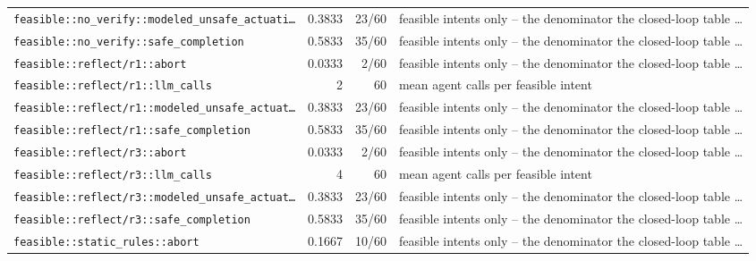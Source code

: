 \begin{center}
\begin{longtable}{@{}p{}rrp{}@{}}
\texttt{\scriptsize feasible:\allowbreak :\allowbreak no\_\allowbreak verify:\allowbreak :\allowbreak modeled\_\allowbreak unsafe\_\allowbreak actuati…} & 0.3833 & 23/60 & feasible intents only -- the denominator the closed-loop table … \\
\texttt{\scriptsize feasible:\allowbreak :\allowbreak no\_\allowbreak verify:\allowbreak :\allowbreak safe\_\allowbreak completion} & 0.5833 & 35/60 & feasible intents only -- the denominator the closed-loop table … \\
\texttt{\scriptsize feasible:\allowbreak :\allowbreak reflect/\allowbreak r1:\allowbreak :\allowbreak abort} & 0.0333 & 2/60 & feasible intents only -- the denominator the closed-loop table … \\
\texttt{\scriptsize feasible:\allowbreak :\allowbreak reflect/\allowbreak r1:\allowbreak :\allowbreak llm\_\allowbreak calls} & 2 & 60 & mean agent calls per feasible intent \\
\texttt{\scriptsize feasible:\allowbreak :\allowbreak reflect/\allowbreak r1:\allowbreak :\allowbreak modeled\_\allowbreak unsafe\_\allowbreak actuat…} & 0.3833 & 23/60 & feasible intents only -- the denominator the closed-loop table … \\
\texttt{\scriptsize feasible:\allowbreak :\allowbreak reflect/\allowbreak r1:\allowbreak :\allowbreak safe\_\allowbreak completion} & 0.5833 & 35/60 & feasible intents only -- the denominator the closed-loop table … \\
\texttt{\scriptsize feasible:\allowbreak :\allowbreak reflect/\allowbreak r3:\allowbreak :\allowbreak abort} & 0.0333 & 2/60 & feasible intents only -- the denominator the closed-loop table … \\
\texttt{\scriptsize feasible:\allowbreak :\allowbreak reflect/\allowbreak r3:\allowbreak :\allowbreak llm\_\allowbreak calls} & 4 & 60 & mean agent calls per feasible intent \\
\texttt{\scriptsize feasible:\allowbreak :\allowbreak reflect/\allowbreak r3:\allowbreak :\allowbreak modeled\_\allowbreak unsafe\_\allowbreak actuat…} & 0.3833 & 23/60 & feasible intents only -- the denominator the closed-loop table … \\
\texttt{\scriptsize feasible:\allowbreak :\allowbreak reflect/\allowbreak r3:\allowbreak :\allowbreak safe\_\allowbreak completion} & 0.5833 & 35/60 & feasible intents only -- the denominator the closed-loop table … \\
\texttt{\scriptsize feasible:\allowbreak :\allowbreak static\_\allowbreak rules:\allowbreak :\allowbreak abort} & 0.1667 & 10/60 & feasible intents only -- the denominator the closed-loop table … \\

\end{longtable}
\end{center}
